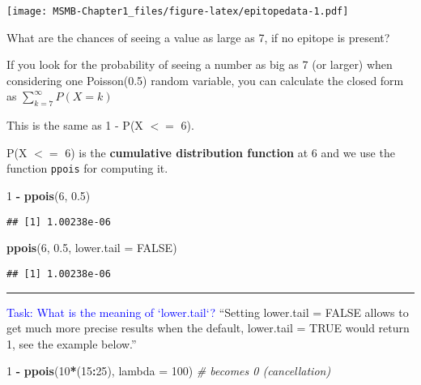 \documentclass[]{article}
\newenvironment{Shaded}{\begin{snugshade}}{\end{snugshade}}
\newcommand{\KeywordTok}[1]{\textcolor[rgb]{0.13,0.29,0.53}{\textbf{#1}}}
\newcommand{\DataTypeTok}[1]{\textcolor[rgb]{0.13,0.29,0.53}{#1}}
\newcommand{\DecValTok}[1]{\textcolor[rgb]{0.00,0.00,0.81}{#1}}
\newcommand{\FloatTok}[1]{\textcolor[rgb]{0.00,0.00,0.81}{#1}}
\newcommand{\StringTok}[1]{\textcolor[rgb]{0.31,0.60,0.02}{#1}}
\newcommand{\CommentTok}[1]{\textcolor[rgb]{0.56,0.35,0.01}{\textit{#1}}}
\newcommand{\OtherTok}[1]{\textcolor[rgb]{0.56,0.35,0.01}{#1}}
\newcommand{\OperatorTok}[1]{\textcolor[rgb]{0.81,0.36,0.00}{\textbf{#1}}}
\newcommand{\NormalTok}[1]{#1}
\let\origfigure\figure
\let\endorigfigure\endfigure
\renewenvironment{figure}[1][2] {
    \expandafter\origfigure\expandafter[H]
} {
    \endorigfigure
}
\let\oldrule=\rule
\renewcommand{\rule}[1]{\oldrule{\linewidth}}
\begin{document}
\begin{figure}
\centering
\texttt{[image: MSMB-Chapter1\_files/figure-latex/epitopedata-1.pdf]}
\caption{Output of the ELISA array results for 50 patients in the 100
positions.}
\end{figure}

What are the chances of seeing a value as large as 7, if no epitope is
present?

If you look for the probability of seeing a number as big as 7 (or
larger) when considering one Poisson(0.5) random variable, you can
calculate the closed form as \(\sum_{k=7}^{\infty} P(X=k)\)

This is the same as 1 - P(X \(<=\) 6).

P(X \(<=\) 6) is the \textbf{cumulative distribution function} at 6 and
we use the function \texttt{ppois} for computing it.

\begin{Shaded}
\begin{Highlighting}[]
\DecValTok{1} \OperatorTok{-}\StringTok{ }\KeywordTok{ppois}\NormalTok{(}\DecValTok{6}\NormalTok{, }\FloatTok{0.5}\NormalTok{)}
\end{Highlighting}
\end{Shaded}

\begin{verbatim}
## [1] 1.00238e-06
\end{verbatim}

\begin{Shaded}
\begin{Highlighting}[]
\KeywordTok{ppois}\NormalTok{(}\DecValTok{6}\NormalTok{, }\FloatTok{0.5}\NormalTok{, }\DataTypeTok{lower.tail =} \OtherTok{FALSE}\NormalTok{)}
\end{Highlighting}
\end{Shaded}

\begin{verbatim}
## [1] 1.00238e-06
\end{verbatim}

\begin{center}\rule{0.5\linewidth}{\linethickness}\end{center}

\textcolor{blue}{Task: What is the meaning of `lower.tail`?} ``Setting
lower.tail = FALSE allows to get much more precise results when the
default, lower.tail = TRUE would return 1, see the example below.''

\begin{Shaded}
\begin{Highlighting}[]
\DecValTok{1} \OperatorTok{-}\StringTok{ }\KeywordTok{ppois}\NormalTok{(}\DecValTok{10}\OperatorTok{*}\NormalTok{(}\DecValTok{15}\OperatorTok{:}\DecValTok{25}\NormalTok{), }\DataTypeTok{lambda =} \DecValTok{100}\NormalTok{)  }\CommentTok{# becomes 0 (cancellation)}
\end{Highlighting}
\end{Shaded}
\end{document}
